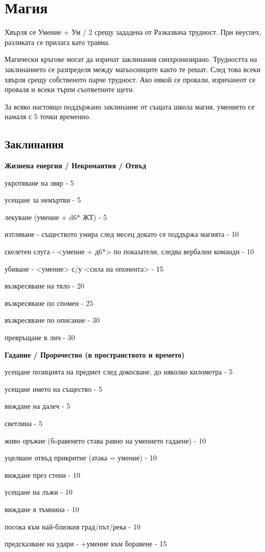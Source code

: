 \chapter{Магия}
Хвърля се Умение + Ум / 2 срещу зададена от Разказвача трудност. При
неуспех, разликата се прилага като травма.

Магически кръгове могат да изричат заклинания синхронизирано. Трудността
на заклинанието се разпределя между магьосниците както те решат. След това
всеки хвърля срещу собственото парче трудност. Ако някой се провали,
изричанеот се проваля и всеки търпи съответните щети.

За всяко настоящо поддържано заклинание от същата школа магия, умението се
намаля с 5 точки временно.

\section{Заклинания}

\textbf{Жизнена енергия / Некромантия / Отвъд}
\begin{itemize*}
  \item{укротяване на звяр - 5}
  \item{усещане за немъртви - 5}
  \item{лекуване (умение + d6* ЖТ) - 5}
  \item{изтляване - съществото умира след месец  докато се поддържа магията - 10}
  \item{скелетен слуга - <умение + д6*> по показатели, следва вербални команди - 10}
  \item{убиване - <умение> с/у <сила на опонента> - 15}
  \item{възкресяване на тяло - 20}
  \item{възкресяване по спомен - 25}
  \item{възкресяване по описание - 30}
  \item{превръщане в лич - 30}
\end{itemize*}

\vspace{1cm}
\textbf{Гадание / Пророчество (в пространството и времето)}
\begin{itemize*}
  \item{усещане позицията на предмет след докосване, до няколко километра - 5}
  \item{усещане името на същество - 5}
  \item{виждане на далеч - 5}
  \item{светлина - 5}
  \item{живо оръжие (бoравенето става равно на умението гадаене) - 10}
  \item{уцелване отвъд прикритие (атака = умение) - 10}
  \item{виждане през стени - 10}
  \item{усещане на лъжи - 10}
  \item{виждане в тъмнина - 10}
  \item{посока към най-близкия град/път/река - 10}
  \item{предсказване на удари - +умение към боравене - 15}
\end{itemize*}


